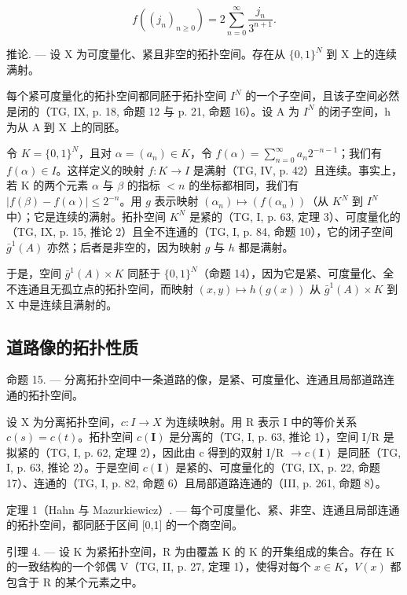 \[
f ((j _ {n}) _ {n \geqslant 0}) = 2 \sum_ {n = 0} ^ {\infty} \frac {j _ {n}}{3 ^ {n + 1}}.
\]

推论. --- 设 X 为可度量化、紧且非空的拓扑空间。存在从 \(\{0,1\}^{N}\) 到 X 上的连续满射。

每个紧可度量化的拓扑空间都同胚于拓扑空间 \(I^{N}\) 的一个子空间，且该子空间必然是闭的（TG, IX, p. 18, 命题 12 与 p. 21, 命题 16）。设 A 为 \(I^{N}\) 的闭子空间，h 为从 A 到 X 上的同胚。

令 \(K = \{0,1\}^{N}\)，且对 \(\alpha = (a_n) \in K\)，令 \(f(\alpha) = \sum_{n=0}^{\infty} a_n 2^{-n-1}\)；我们有 \(f(\alpha) \in I\)。这样定义的映射 \(f: K \to I\) 是满射（TG, IV, p. 42）且连续。事实上，若 K 的两个元素 \(\alpha\) 与 \(\beta\) 的指标 \(< n\) 的坐标都相同，我们有 \(|f(\beta) - f(\alpha)| \leqslant 2^{-n}\)。用 \(g\) 表示映射 \((\alpha_n) \mapsto (f(\alpha_n))\)（从 \(K^N\) 到 \(I^N\) 中）；它是连续的满射。拓扑空间 \(K^N\) 是紧的（TG, I, p. 63, 定理 3）、可度量化的（TG, IX, p. 15, 推论 2）且全不连通的（TG, I, p. 84, 命题 10），它的闭子空间 \(\bar{g}^{1}(A)\) 亦然；后者是非空的，因为映射 \(g\) 与 \(h\) 都是满射。

于是，空间 \(\bar{g}^{1}(A) \times K\) 同胚于 \(\{0,1\}^{N}\)（命题 14），因为它是紧、可度量化、全不连通且无孤立点的拓扑空间，而映射 \((x,y) \mapsto h(g(x))\) 从 \(\bar{g}^{1}(A) \times K\) 到 X 中是连续且满射的。

\subsection{道路像的拓扑性质}

命题 15. --- 分离拓扑空间中一条道路的像，是紧、可度量化、连通且局部道路连通的拓扑空间。

设 X 为分离拓扑空间，\(c\colon I \to X\) 为连续映射。用 R 表示 I 中的等价关系 \(c(s) = c(t)\)。拓扑空间 \(c(\mathbf{I})\) 是分离的（TG, I, p. 63, 推论 1），空间 I/R 是拟紧的（TG, I, p. 62, 定理 2），因此由 c 得到的双射 I/R \(\to c(\mathbf{I})\) 是同胚（TG, I, p. 63, 推论 2）。于是空间 \(c(\mathbf{I})\) 是紧的、可度量化的（TG, IX, p. 22, 命题 17）、连通的（TG, I, p. 82, 命题 6）且局部道路连通的（III, p. 261, 命题 8）。

定理 1（Hahn 与 Mazurkiewicz）. --- 每个可度量化、紧、非空、连通且局部连通的拓扑空间，都同胚于区间 {[}0,1{]} 的一个商空间。

引理 4. --- 设 K 为紧拓扑空间，R 为由覆盖 K 的 K 的开集组成的集合。存在 K 的一致结构的一个邻偶 V（TG, II, p. 27, 定理 1），使得对每个 \(x \in K\)，\(V(x)\) 都包含于 R 的某个元素之中。

